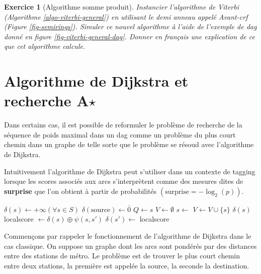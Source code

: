 \documentclass[11pt,openany]{book}
\newtheorem{exo}{Exercice}[chapter]
\newcommand{\ac}[1]{{\sc #1}} %
\newcommand{\kw}[1]{{\bf #1}} %
\begin{document}
\begin{exo}[Algorithme somme produit]
Instancier l'algorithme de Viterbi (Algorithme
\ref{algo-viterbi-general}) en utilisant le demi anneau 
appelé Avant-\ac{crf} (Figure \ref{fig-semirings}). Simuler ce nouvel
algorithme à l'aide de l'exemple  de \ac{dag} donné en figure
\ref{fig-viterbi-general-dag}. Donner en français une explication de
ce que cet algorithme calcule. 
\end{exo}


\section{Algorithme de Dijkstra et recherche A$\star$}
\label{sec-dijkstra}

Dans certains cas, il est possible de reformuler le problème de recherche de la séquence
de poids maximal dans un \ac{dag} comme un problème du plus court
chemin dans un graphe de telle sorte que le problème se résoud avec
l'algorithme de Dijkstra.
 
Intuitivement l'algorithme de Dijkstra peut s'utiliser dans un
contexte de tagging lorsque les scores associés aux arcs
s'interprètent comme des mesures dites de \kw{surprise} que l'on obtient à partir
de probabilités $(\text{surprise} =  -\log_2(p))$.


\begin{algorithm}[htbp]
\begin{algorithmic}
\State $ \delta(s) \gets +\infty$\qquad$(\forall s \in S)$ 
\State $ \delta(\text{source}) \gets \bar{0}$ 
\State $Q \gets s$
\State $V \gets \emptyset$
    \State $s \gets$  
    \State $V \gets V \cup \{s\}$
        \State\Return $\delta(s)$
    \EndIf
        \State localscore $\gets \delta(s) \oplus \psi(s,s')$
              \State $\delta(s') \gets$ localscore
              \State {}
        \EndIf
       \EndIf
    \EndFor
\EndWhile
\EndFunction
\end{algorithmic}
\caption{\label{algo-dijkstra-general}Algorithme de Dijkstra}
\end{algorithm}


Commençons par rappeler le fonctionnement de l'algorithme de Dijkstra
dans le cas classique. On suppose un graphe dont les arcs sont
pondérés par des distances entre des stations de métro. Le problème est de trouver le
plus court chemin entre deux stations, la première est appelée la
source, la seconde la destination.
\end{document}
